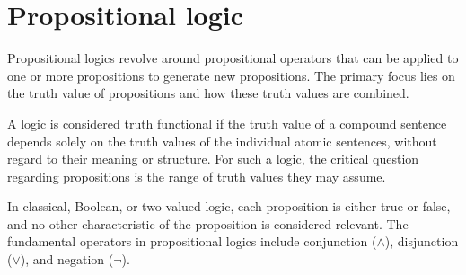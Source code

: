 \section{Propositional logic}

Propositional logics revolve around propositional operators that can be applied to one or more propositions to generate new propositions. 
The primary focus lies on the truth value of propositions and how these truth values are combined.
\begin{definition}
    A logic is considered truth functional if the truth value of a compound sentence depends solely on the truth values of the individual atomic sentences, without regard to their meaning or structure. 
    For such a logic, the critical question regarding propositions is the range of truth values they may assume.
\end{definition}
In classical, Boolean, or two-valued logic, each proposition is either true or false, and no other characteristic of the proposition is considered relevant.
The fundamental operators in propositional logics include conjunction ($\land$), disjunction ($\lor$), and negation ($\lnot$).